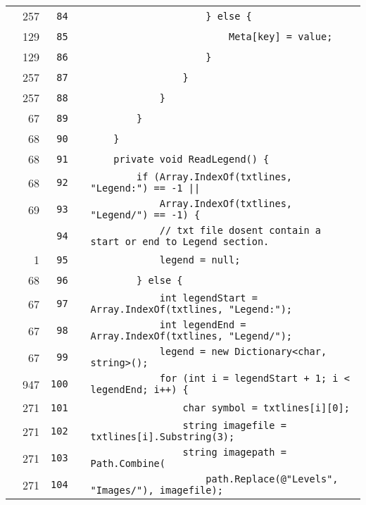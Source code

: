 \documentclass[a4paper,landscape,10pt]{article}
\begin{document}
\begin{longtable}[l]{lrrll}
\cellcolor{green} & 257 & \verb~84~ & & \verb~                    } else {~\\
\cellcolor{green} & 129 & \verb~85~ & & \verb~                        Meta[key] = value;~\\
\cellcolor{green} & 129 & \verb~86~ & & \verb~                    }~\\
\cellcolor{green} & 257 & \verb~87~ & & \verb~                }~\\
\cellcolor{green} & 257 & \verb~88~ & & \verb~            }~\\
\cellcolor{green} & 67 & \verb~89~ & & \verb~        }~\\
\cellcolor{green} & 68 & \verb~90~ & & \verb~    }~\\
\cellcolor{green} & 68 & \verb~91~ & & \verb~    private void ReadLegend() {~\\
\cellcolor{orange} & 68 & \verb~92~ & & \verb~        if (Array.IndexOf(txtlines, "Legend:") == -1 ||~\\
\cellcolor{green} & 69 & \verb~93~ & & \verb~            Array.IndexOf(txtlines, "Legend/") == -1) {~\\
\cellcolor{gray} &  & \verb~94~ & & \verb~            // txt file dosent contain a start or end to Legend section.~\\
\cellcolor{green} & 1 & \verb~95~ & & \verb~            legend = null;~\\
\cellcolor{green} & 68 & \verb~96~ & & \verb~        } else {~\\
\cellcolor{green} & 67 & \verb~97~ & & \verb~            int legendStart = Array.IndexOf(txtlines, "Legend:");~\\
\cellcolor{green} & 67 & \verb~98~ & & \verb~            int legendEnd = Array.IndexOf(txtlines, "Legend/");~\\
\cellcolor{green} & 67 & \verb~99~ & & \verb~            legend = new Dictionary<char, string>();~\\
\cellcolor{green} & 947 & \verb~100~ & & \verb~            for (int i = legendStart + 1; i < legendEnd; i++) {~\\
\cellcolor{green} & 271 & \verb~101~ & & \verb~                char symbol = txtlines[i][0];~\\
\cellcolor{green} & 271 & \verb~102~ & & \verb~                string imagefile = txtlines[i].Substring(3);~\\
\cellcolor{green} & 271 & \verb~103~ & & \verb~                string imagepath = Path.Combine(~\\
\cellcolor{green} & 271 & \verb~104~ & & \verb~                    path.Replace(@"Levels", "Images/"), imagefile);~\\

\end{longtable}
\end{document}
